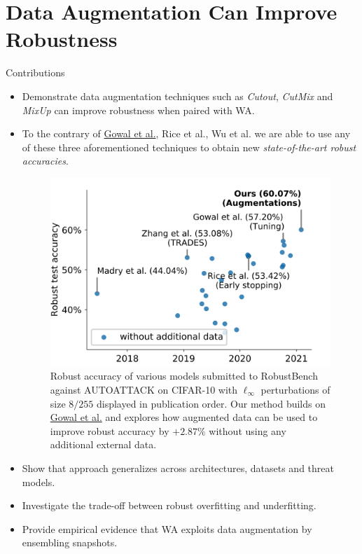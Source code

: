 \section{Data Augmentation Can Improve Robustness}

\begin{frame}{Contributions}
    \begin{itemize}[<+-| alert@+>] %
        \item Demonstrate data augmentation techniques such as \textit{Cutout}, \textit{CutMix} and \textit{MixUp} can improve robustness when paired with WA.
        \item To the contrary of \href{https://arxiv.org/pdf/2010.03593}{Gowal et al.}, Rice et al., Wu et al. we are able to use any of these three aforementioned techniques to obtain new \emph{state-of-the-art robust accuracies}. 
        \begin{figure}
            \begin{minipage}[c]{0.45\linewidth}
                \includegraphics[width=\linewidth]{pic/sota.png}
            \end{minipage}
            \begin{minipage}[c]{0.45\textwidth}
                \caption{Robust accuracy of various models submitted to RobustBench against AUTOATTACK on CIFAR-10 with $\ell_\infty$ perturbations of size $8/255$ displayed in publication order. Our method builds on \href{https://arxiv.org/pdf/2010.03593}{Gowal et al.} and explores how augmented data can be used to improve robust accuracy by $+2.87\%$ without using any additional external data.} \label{fig:sota}
            \end{minipage}
        \end{figure}
        \item Show that approach generalizes across architectures, datasets and threat models.
        \item Investigate the trade-off between robust overfitting and underfitting.
        \item Provide empirical evidence that WA exploits data augmentation by ensembling snapshots.
    \end{itemize}
\end{frame}

